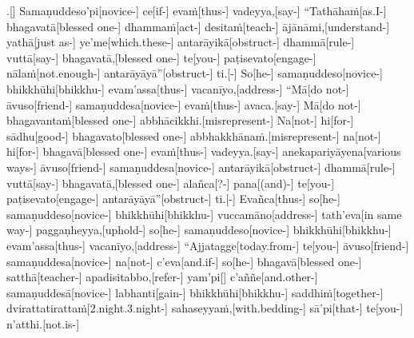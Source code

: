 \documentclass[12pt]{article}
\begin{document}
\begin{paracol}{2}
\begin{column}
\switchcolumn


\begin{flushleft}
.[] Samaṇuddeso’pi[novice-] ce[if-\NUL{\GMU{}}] evaṁ[thus-] vadeyya,[say-] “Tathāhaṁ[as.I-] bhagavatā[blessed one-] dhammaṁ[act-] desitaṁ[teach-] ājānāmi,[understand-] yathā[just as-] ye’me[which.these-\NUL{\GMU{}}] antarāyikā[obstruct-] dhammā[rule-] vuttā[say-] bhagavatā,[blessed one-] te[you-] paṭisevato[engage-] nālaṁ[not.enough-] antarāyāyā”[obstruct-] ti.[-\NUL{\GMU{}}] So[he-] samaṇuddeso[novice-] bhikkhūhi[bhikkhu-] evam’assa[thus-] vacanīyo,[address-] “Mā[do not-] āvuso[friend-] samaṇuddesa[novice-] evaṁ[thus-] avaca.[say-\NUL{\GMU{}}] Mā[do not-] bhagavantaṁ[blessed one-] abbhācikkhi.[misrepresent-] Na[not-] hi[for-] sādhu[good-] bhagavato[blessed one-] abbhakkhānaṁ.[misrepresent-\NUL{\GMU{}}] na[not-] hi[for-] bhagavā[blessed one-] evaṁ[thus-] vadeyya.[say-] anekapariyāyena[various ways-] āvuso[friend-] samaṇuddesa[novice-] antarāyikā[obstruct-] dhammā[rule-] vuttā[say-] bhagavatā,[blessed one-] alañca[?-\NUL{\GMU{}}] pana[(and)-] te[you-] paṭisevato[engage-] antarāyāyā”[obstruct-] ti.[-\NUL{\GMU{}}] Evañca[thus-] so[he-] samaṇuddeso[novice-] bhikkhūhi[bhikkhu-] vuccamāno[address-] tath’eva[in same way-\NUL{\GMU{}}] paggaṇheyya,[uphold-] so[he-] samaṇuddeso[novice-] bhikkhūhi[bhikkhu-] evam’assa[thus-] vacanīyo,[address-] “Ajjatagge[today.from-] te[you-] āvuso[friend-] samaṇuddesa[novice-] na[not-] c’eva[and.if-\NUL{\GMU{}}] so[he-] bhagavā[blessed one-] satthā[teacher-] apadisitabbo,[refer-] yam’pi[] c’aññe[and.other-] samaṇuddesā[novice-] labhanti[gain-] bhikkhūhi[bhikkhu-] saddhiṁ[together-] dvirattatirattaṁ[2.night.3.night-] sahaseyyaṁ,[with.bedding-] sā’pi[that-] te[you-] n’atthi.[not.is-] 
\end{flushleft}
\end{column}
\end{paracol}
\end{document}
